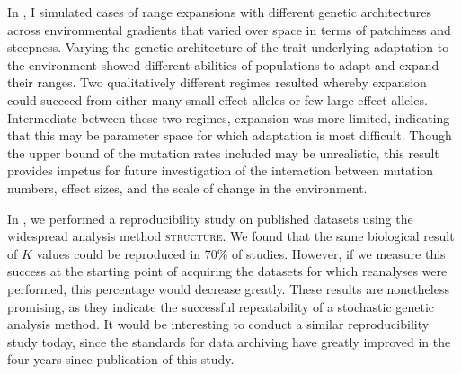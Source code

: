 In , I simulated cases of range expansions with different genetic architectures across environmental gradients that varied over space in terms of patchiness and steepness. Varying the genetic architecture of the trait underlying adaptation to the environment showed different abilities of populations to adapt and expand their ranges. Two qualitatively different regimes resulted whereby expansion could succeed from either many small effect alleles or few large effect alleles. Intermediate between these two regimes, expansion was more limited, indicating that this may be parameter space for which adaptation is most difficult. Though the upper bound of the mutation rates included may be unrealistic, this result provides impetus for future investigation of the interaction between mutation numbers, effect sizes, and the scale of change in the environment.

In , we performed a reproducibility study on published datasets using the widespread analysis method \textsc{structure}. We found that the same biological result of $K$ values could be reproduced in 70\% of studies. However, if we measure this success at the starting point of acquiring the datasets for which reanalyses were performed, this percentage would decrease greatly. %
These results are nonetheless promising, as they indicate the successful repeatability of a stochastic genetic analysis method. It would be interesting to conduct a similar reproducibility study today, since the standards for data archiving have greatly improved in the four years since publication of this study.




